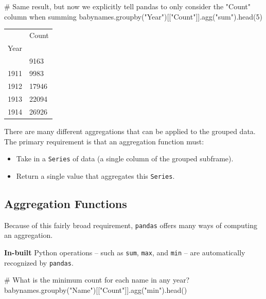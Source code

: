 \documentclass[
  letterpaper,
  DIV=11,
  numbers=noendperiod]{scrreprt}
\newenvironment{Shaded}{\begin{snugshade}}{\end{snugshade}}
\newcommand{\CommentTok}[1]{\textcolor[rgb]{0.37,0.37,0.37}{#1}}
\newcommand{\DecValTok}[1]{\textcolor[rgb]{0.68,0.00,0.00}{#1}}
\newcommand{\NormalTok}[1]{\textcolor[rgb]{0.00,0.23,0.31}{#1}}
\newcommand{\StringTok}[1]{\textcolor[rgb]{0.13,0.47,0.30}{#1}}
\providecommand{\tightlist}{%
  \setlength{\itemsep}{0pt}\setlength{\parskip}{0pt}}\usepackage{longtable,booktabs,array}
\begin{document}
\begin{Shaded}
\begin{Highlighting}[]
\CommentTok{\# Same result, but now we explicitly tell pandas to only consider the "Count" column when summing}
\NormalTok{babynames.groupby(}\StringTok{"Year"}\NormalTok{)[[}\StringTok{"Count"}\NormalTok{]].agg(}\StringTok{"sum"}\NormalTok{).head(}\DecValTok{5}\NormalTok{)}
\end{Highlighting}
\end{Shaded}

\begin{longtable}[]{@{}ll@{}}
\toprule\noalign{}
& Count \\
Year & \\
\midrule\noalign{}
\endhead
\bottomrule\noalign{}
\endlastfoot
1910 & 9163 \\
1911 & 9983 \\
1912 & 17946 \\
1913 & 22094 \\
1914 & 26926 \\
\end{longtable}

There are many different aggregations that can be applied to the grouped
data. The primary requirement is that an aggregation function must:

\begin{itemize}
\tightlist
\item
  Take in a \texttt{Series} of data (a single column of the grouped
  subframe).
\item
  Return a single value that aggregates this \texttt{Series}.
\end{itemize}

\subsection{Aggregation Functions}\label{aggregation-functions}

Because of this fairly broad requirement, \texttt{pandas} offers many
ways of computing an aggregation.

\textbf{In-built} Python operations -- such as \texttt{sum},
\texttt{max}, and \texttt{min} -- are automatically recognized by
\texttt{pandas}.

\begin{Shaded}
\begin{Highlighting}[]
\CommentTok{\# What is the minimum count for each name in any year?}
\NormalTok{babynames.groupby(}\StringTok{"Name"}\NormalTok{)[[}\StringTok{"Count"}\NormalTok{]].agg(}\StringTok{"min"}\NormalTok{).head()}
\end{Highlighting}
\end{Shaded}
\end{document}
